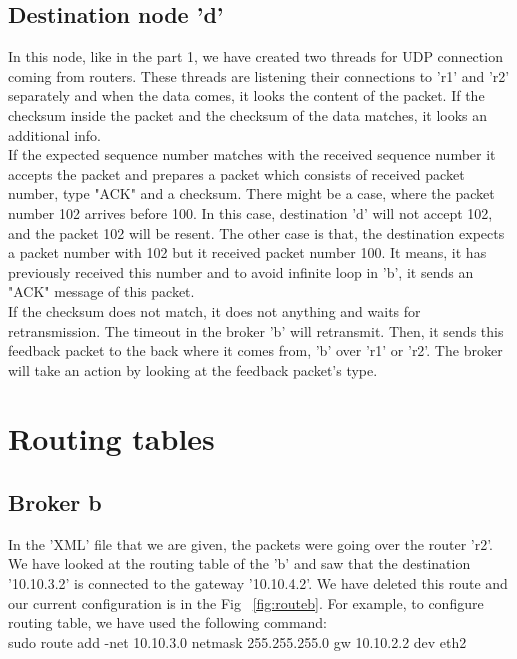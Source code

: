 \documentclass[12pt,journal,compsoc]{IEEEtran}
\begin{document}
\subsection{Destination node 'd'}
In this node, like in the part 1, we have created two threads for UDP connection coming from routers. These threads are listening their connections to 'r1' and 'r2' separately and when the data comes, it looks the content of the packet. If the checksum inside the packet and the checksum of the data matches, it looks an additional info.\\ If the expected sequence number matches with the received sequence number it accepts the packet and prepares a packet which consists of received packet number, type "ACK" and a checksum. There might be a case, where the packet number 102 arrives before 100. In this case, destination 'd' will not accept 102, and the packet 102 will be resent. The other case is that, the destination expects a packet number with 102 but it received packet number 100. It means, it has previously received this number and to avoid infinite loop in 'b', it sends an "ACK" message of this packet.\\
If the checksum does not match, it does not anything and waits for retransmission. The timeout in the broker 'b' will retransmit. Then, it sends this feedback packet to the back where it comes from, 'b' over 'r1' or 'r2'. The broker will take an action by looking at the feedback packet's type.\\
\section{Routing tables}
\subsection{Broker b}
In the 'XML' file that we are given, the packets were going over the router 'r2'. We have looked at the routing table of the 'b' and saw that the destination '10.10.3.2' is connected to the gateway '10.10.4.2'. We have deleted this route and our current configuration is in the Fig ~\ref{fig:routeb}. For example, to configure routing table, we have used the following command:\\

sudo route add -net 10.10.3.0 netmask 255.255.255.0 gw 10.10.2.2 dev eth2\\
\end{document}
